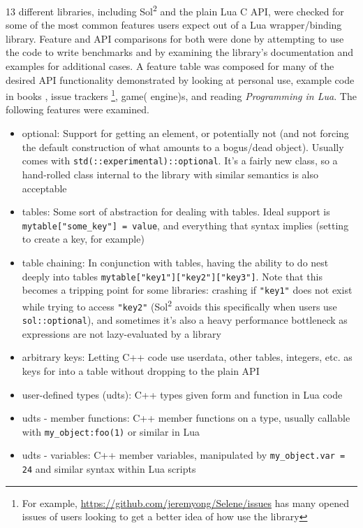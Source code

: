 \documentclass[conference,compsoc]{IEEEtran}
\newcommand{\soltwo}{Sol\textsuperscript{2}}
\begin{document}
13 different libraries, including \soltwo{} and the plain Lua C API, were checked for some of the most common features users expect out of a Lua wrapper/binding library. Feature and API comparisons for both were done by attempting to use the code to write benchmarks and by examining the library's documentation and examples for additional cases. A feature table was composed for many of the desired API functionality demonstrated by looking at personal use, example code in books \cite{lua-game-cryengine}, issue trackers \footnote{For example, \url{https://github.com/jeremyong/Selene/issues} has many opened issues of users looking to get a better idea of how use the library}, game( engine)s\cite{amulet}, and reading \emph{Programming in Lua}\cite{lua-programming}. The following features were examined.

\begin{itemize}
	\item[1] optional: Support for getting an element, or potentially not (and not forcing the default construction of what amounts to a bogus/dead object). Usually comes with \lstinline|std(::experimental)::optional|. It's a fairly new class, so a hand-rolled class internal to the library with similar semantics is also acceptable
	\item[2] tables: Some sort of abstraction for dealing with tables. Ideal support is \lstinline|mytable["some_key"] = value|, and everything that syntax implies (setting to create a key, for example)
	\item[3] table chaining: In conjunction with tables, having the ability to do nest deeply into tables \lstinline|mytable["key1"]["key2"]["key3"]|. Note that this becomes a tripping point for some libraries: crashing if \lstinline|"key1"| does not exist while trying to access \lstinline|"key2"| (\soltwo{} avoids this specifically when users use \lstinline|sol::optional|), and sometimes it's also a heavy performance bottleneck as expressions are not lazy-evaluated by a library
	\item[4] arbitrary keys: Letting C++ code use userdata, other tables, integers, etc. as keys for into a table without dropping to the plain API
	\item[5] user-defined types (udts): C++ types given form and function in Lua code
	\item[6] udts - member functions: C++ member functions on a type, usually callable with \lstinline|my_object:foo(1)| or similar in Lua
	\item[7] udts - variables: C++ member variables, manipulated by \lstinline|my_object.var = 24| and similar syntax within Lua scripts

\end{itemize}
\end{document}
